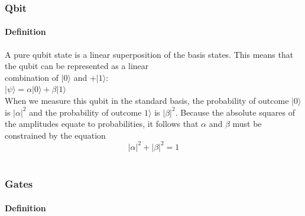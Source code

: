 \begin{frame}
	\frametitle{Qbit}
		\framesubtitle{Definition}
		\vspace{-1cm}
	{\normalsize
	A pure qubit state is a linear superposition of the basis states. This means that the qubit can be represented as a linear\\ combination of $|0\rangle$ and +$|1\rangle $:\\ 
    $|\psi \rangle =\alpha |0\rangle +\beta |1\rangle$\\
  
    When we measure this qubit in the standard basis, the probability of outcome $|0\rangle$  is $|\alpha |^{2}$ and the probability of outcome $1\rangle$  is $|\beta |^{2}$. Because the absolute squares of the amplitudes equate to probabilities, it follows that
     $\alpha$ and $\beta$ must be constrained by the equation
$$|\alpha |^{2}+|\beta |^{2}=1$$\\
	}
\end{frame}

\begin{frame}
	\frametitle{Gates}
		\framesubtitle{Definition}
		\vspace{-1cm}
	{\normalsize
	\hspace{0.5cm}{In quantum computing and specifically the quantum circuit model of computation, a quantum gate (or quantum logic gate) is a basic quantum circuit operating on a small number of qubits.}\\
	\vspace{0.4cm}
	\hspace{0.5cm}{.}\\
	}
\end{frame}

